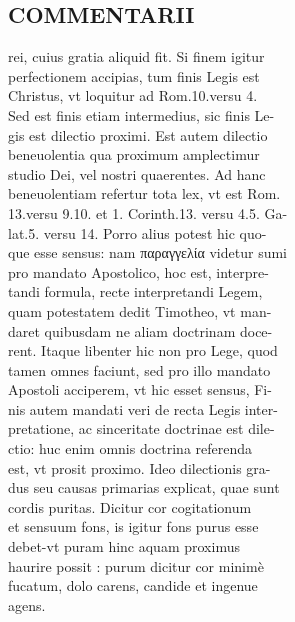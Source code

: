 \documentclass{article}
\begin{document}
\begin{pages}
\section*{COMMENTARII \\
                }rei, cuius gratia aliquid fit. Si finem igitur \\
                perfectionem accipias, tum finis Legis est \\
                Christus, vt loquitur ad Rom.10.versu 4. \\
                Sed est finis etiam intermedius, sic finis Le- \\
                gis est dilectio proximi. Est autem dilectio \\
                beneuolentia qua proximum amplectimur \\
                studio Dei, vel nostri quaerentes. Ad hanc \\
                beneuolentiam refertur tota lex, vt est Rom. \\
                13.versu 9.10. et 1. Corinth.13. versu 4.5. Ga- \\
                lat.5. versu 14. Porro alius potest hic quo- \\
                que esse sensus: nam παραγγελία videtur sumi \\
                pro mandato Apostolico, hoc est, interpre- \\
                tandi formula, recte interpretandi Legem, \\
                quam potestatem dedit Timotheo, vt man- \\
                daret quibusdam ne aliam doctrinam doce- \\
                rent. Itaque libenter hic non pro Lege, quod \\
                tamen omnes faciunt, sed pro illo mandato \\
                Apostoli acciperem, vt hic esset sensus, Fi- \\
                nis autem mandati veri de recta Legis inter- \\
                pretatione, ac sinceritate doctrinae est dile- \\
                ctio: huc enim omnis doctrina referenda \\
                est, vt prosit proximo. Ideo dilectionis gra- \\
                dus seu causas primarias explicat, quae sunt \\
                cordis puritas. Dicitur cor cogitationum \\
                et sensuum fons, is igitur fons purus esse \\
                debet-vt puram hinc aquam proximus \\
                haurire possit : purum dicitur cor minimè \\
                fucatum, dolo carens, candide et ingenue \\
                agens. \\
                

\end{pages}
\end{document}
